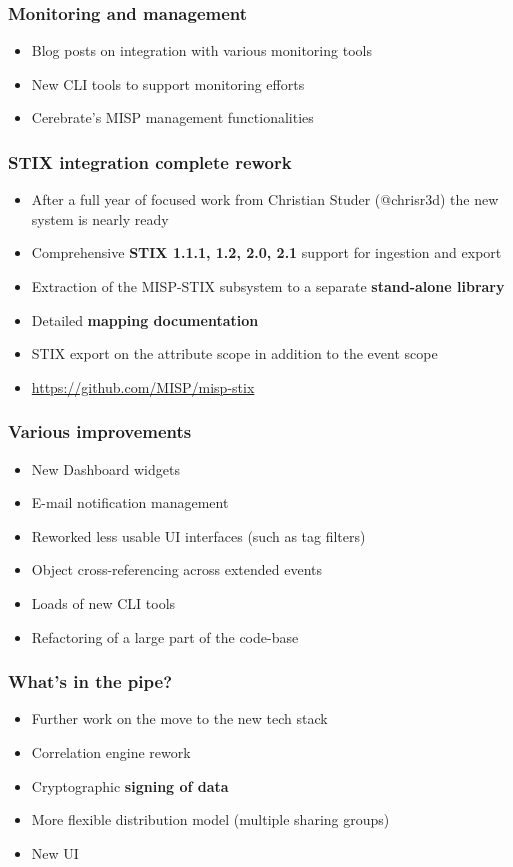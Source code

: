 \begin{frame}
\frametitle{Monitoring and management}
\begin{itemize}
	\item Blog posts on integration with various monitoring tools
        \item New CLI tools to support monitoring efforts
        \item Cerebrate's MISP management functionalities
\end{itemize}
\end{frame}

\begin{frame}
\frametitle{STIX integration complete rework}
\begin{itemize}
	\item After a full year of focused work from Christian Studer (@chrisr3d) the new system is nearly ready
        \item Comprehensive {\bf STIX 1.1.1, 1.2, 2.0, 2.1} support for ingestion and export
        \item Extraction of the MISP-STIX subsystem to a separate {\bf stand-alone library}
        \item Detailed {\bf mapping documentation}
        \item STIX export on the attribute scope in addition to the event scope
        \item \url{https://github.com/MISP/misp-stix}
\end{itemize}
\end{frame}

\begin{frame}
\frametitle{Various improvements}
\begin{itemize}
	\item New Dashboard widgets
        \item E-mail notification management
        \item Reworked less usable UI interfaces (such as tag filters)
        \item Object cross-referencing across extended events
        \item Loads of new CLI tools
        \item Refactoring of a large part of the code-base
\end{itemize}
\end{frame}


\begin{frame}
\frametitle{What's in the pipe?}
\begin{itemize}
	\item Further work on the move to the new tech stack
        \item Correlation engine rework
        \item Cryptographic {\bf signing of data}
        \item More flexible distribution model (multiple sharing groups)
        \item New UI
\end{itemize}
\end{frame}

